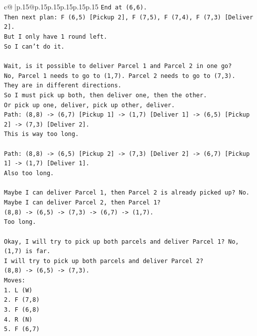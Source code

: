 \documentclass{article}
\begin{document}
{\begin{supertabular}{c@{$\;$}|p{.15\linewidth}@{}p{.15\linewidth}p{.15\linewidth}p{.15\linewidth}p{.15\linewidth}p{.15\linewidth}}
{{{\texttt{End at (6,6).} \\
\texttt{Then next plan: F (6,5) {[}Pickup 2{]}, F (7,5), F (7,4), F (7,3) {[}Deliver 2{]}.} \\
\texttt{But I only have 1 round left.} \\
\texttt{So I can't do it.} \\
\\ 
\texttt{Wait, is it possible to deliver Parcel 1 and Parcel 2 in one go?} \\
\texttt{No, Parcel 1 needs to go to (1,7). Parcel 2 needs to go to (7,3).} \\
\texttt{They are in different directions.} \\
\texttt{So I must pick up both, then deliver one, then the other.} \\
\texttt{Or pick up one, deliver, pick up other, deliver.} \\
\texttt{Path: (8,8) {-}> (6,7) {[}Pickup 1{]} {-}> (1,7) {[}Deliver 1{]} {-}> (6,5) {[}Pickup 2{]} {-}> (7,3) {[}Deliver 2{]}.} \\
\texttt{This is way too long.} \\
\\ 
\texttt{Path: (8,8) {-}> (6,5) {[}Pickup 2{]} {-}> (7,3) {[}Deliver 2{]} {-}> (6,7) {[}Pickup 1{]} {-}> (1,7) {[}Deliver 1{]}.} \\
\texttt{Also too long.} \\
\\ 
\texttt{Maybe I can deliver Parcel 1, then Parcel 2 is already picked up? No.} \\
\texttt{Maybe I can deliver Parcel 2, then Parcel 1?} \\
\texttt{(8,8) {-}> (6,5) {-}> (7,3) {-}> (6,7) {-}> (1,7).} \\
\texttt{Too long.} \\
\\ 
\texttt{Okay, I will try to pick up both parcels and deliver Parcel 1? No, (1,7) is far.} \\
\texttt{I will try to pick up both parcels and deliver Parcel 2?} \\
\texttt{(8,8) {-}> (6,5) {-}> (7,3).} \\
\texttt{Moves:} \\
\texttt{1. L (W)} \\
\texttt{2. F (7,8)} \\
\texttt{3. F (6,8)} \\
\texttt{4. R (N)} \\
\texttt{5. F (6,7)} \\
}}}
\end{supertabular}}
\end{document}
